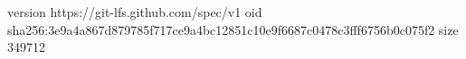 version https://git-lfs.github.com/spec/v1
oid sha256:3e9a4a867d879785f717ce9a4bc12851c10e9f6687c0478c3fff6756b0c075f2
size 349712
